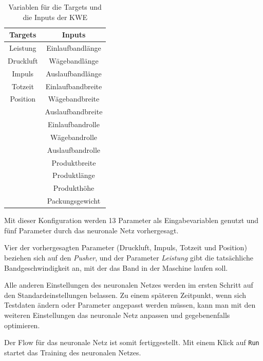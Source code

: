\begin{table}[h]
    \centering
    \begin{tabular}{|c|c|}
        \hline
        \textbf{Targets} & \textbf{Inputs}\\
        \hline
        \hline
        Leistung & Einlaufbandlänge\\
        \hline
        Druckluft & Wägebandlänge\\
        \hline
        Impuls & Auslaufbandlänge\\
        \hline
        Totzeit & Einlaufbandbreite\\
        \hline
        Position & Wägebandbreite\\
        \hline
        & Auslaufbandbreite\\
        \hline
        & Einlaufbandrolle\\
        \hline
        & Wägebandrolle\\
        \hline
        & Auslaufbandrolle\\
        \hline
        & Produktbreite\\
        \hline
        & Produktlänge\\
        \hline
        & Produkthöhe\\
        \hline
        & Packungsgewicht\\
        \hline
    \end{tabular}
    \caption{Variablen für die Targets und die Inputs der KWE}
    \label{tab:targets_inputs}
\end{table}

Mit dieser Konfiguration werden 13 Parameter als Eingabevariablen genutzt und fünf Parameter durch das neuronale Netz
vorhergesagt.

Vier der vorhergesagten Parameter (Druckluft, Impuls, Totzeit und Position) beziehen sich auf den \textit{Pusher}, und
der Parameter \textit{Leistung} gibt die tatsächliche Bandgeschwindigkeit an, mit der das Band in der Maschine laufen
soll.

Alle anderen Einstellungen des neuronalen Netzes werden im ersten Schritt auf den Standardeinstellungen belassen. Zu
einem späteren Zeitpunkt, wenn sich Testdaten ändern oder Parameter angepasst werden müssen, kann man mit den weiteren
Einstellungen das neuronale Netz anpassen und gegebenenfalls optimieren.

Der Flow für das neuronale Netz ist somit fertiggestellt. Mit einem Klick auf \texttt{Run} startet das Training des
neuronalen Netzes.

